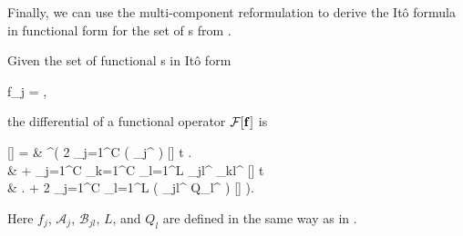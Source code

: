 Finally, we can use the multi-component reformulation to derive the It\^o formula in functional form for the set of s from .

\begin{theorem}
\label{thm:fpe-sde:ito-formula:func-ito-f}
	Given the set of functional s in It\^o form
	\begin{eqn*}
		\upd f_j =  \left[
			\mathcal{A}_j \upd t + \sum_{l=1}^L \mathcal{B}_{jl} \upd Q_l
		\right],
	\end{eqn*}
	the differential of a functional operator $\mathcal{F}[\mathbf{f}]$ is
	\begin{eqn*}
		\upd {}[\fvec]
		={} & \int \upd\xvec^\prime \left(
			2 \sum_{j=1}^C \Real \left(
				_j^\prime \frac{\fdelta}{\fdelta f_j^\prime}
			\right) [\fvec] \upd t \right. \\
		& + \sum_{j=1}^C \sum_{k=1}^C \sum_{l=1}^L
				_{jl}^\prime
				_{kl}^{\prime *}
				\frac{\fdelta}{\fdelta f_j^\prime}
				 [\fvec] \upd t \\
		& \left. + 2 \sum_{j=1}^C \sum_{l=1}^L
			\Real \left(
				_{jl}^\prime
				\upd Q_l^\prime
				\frac{\fdelta}{\fdelta f_j^\prime}
			\right)
			\mathcal{F}[\fvec]
		\right).
	\end{eqn*}
	Here $f_j$, $\mathcal{A}_j$, $\mathcal{B}_{jl}$, $L$, and $Q_l$ are defined in the same way as in .
\end{theorem}
